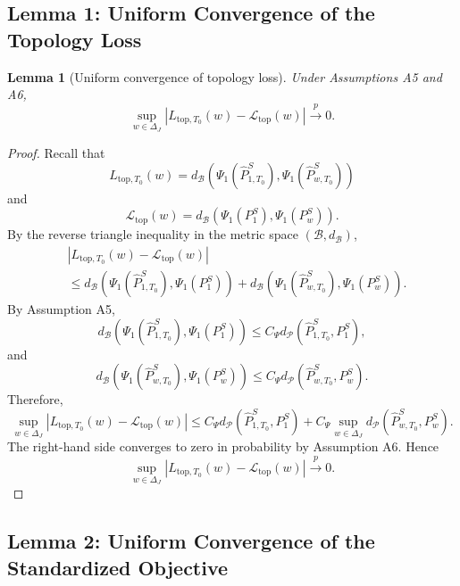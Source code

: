 \documentclass[11pt]{article}
\theoremstyle{plain}
\newtheorem{lemma}[lemma]{Lemma}
\theoremstyle{definition}
\theoremstyle{remark}
\newcommand{\1}{\mathbbm{1}}
\newcommand{\pto}{\xrightarrow{p}}
\begin{document}
\subsection{Lemma 1: Uniform Convergence of the Topology Loss}

\begin{lemma}[Uniform convergence of topology loss]
\label{lem:topology-uniform}
Under Assumptions A5 and A6,
\[
\sup_{w\in\Delta_J}
\left|
L_{\mathrm{top},T_0}(w)
-
\mathcal L_{\mathrm{top}}(w)
\right|
\pto 0.
\]
\end{lemma}

\begin{proof}
Recall that
\[
L_{\mathrm{top},T_0}(w)
=
d_{\mathcal B}
\left(
\Psi_1(\widehat P_{1,T_0}^{S}),
\Psi_1(\widehat P_{w,T_0}^{S})
\right)
\]
and
\[
\mathcal L_{\mathrm{top}}(w)
=
d_{\mathcal B}
\left(
\Psi_1(P_1^{S}),
\Psi_1(P_w^{S})
\right).
\]
By the reverse triangle inequality in the metric space
\((\mathcal B,d_{\mathcal B})\),
\[
\begin{aligned}
&
\left|
L_{\mathrm{top},T_0}(w)
-
\mathcal L_{\mathrm{top}}(w)
\right|
\\
&\le
d_{\mathcal B}
\left(
\Psi_1(\widehat P_{1,T_0}^{S}),
\Psi_1(P_1^{S})
\right)
+
d_{\mathcal B}
\left(
\Psi_1(\widehat P_{w,T_0}^{S}),
\Psi_1(P_w^{S})
\right).
\end{aligned}
\]
By Assumption A5,
\[
d_{\mathcal B}
\left(
\Psi_1(\widehat P_{1,T_0}^{S}),
\Psi_1(P_1^{S})
\right)
\le
C_\Psi d_{\mathcal P}(\widehat P_{1,T_0}^{S},P_1^{S}),
\]
and
\[
d_{\mathcal B}
\left(
\Psi_1(\widehat P_{w,T_0}^{S}),
\Psi_1(P_w^{S})
\right)
\le
C_\Psi d_{\mathcal P}(\widehat P_{w,T_0}^{S},P_w^{S}).
\]
Therefore,
\[
\sup_{w\in\Delta_J}
\left|
L_{\mathrm{top},T_0}(w)
-
\mathcal L_{\mathrm{top}}(w)
\right|
\le
C_\Psi d_{\mathcal P}(\widehat P_{1,T_0}^{S},P_1^{S})
+
C_\Psi
\sup_{w\in\Delta_J}
d_{\mathcal P}(\widehat P_{w,T_0}^{S},P_w^{S}).
\]
The right-hand side converges to zero in probability by Assumption A6. Hence
\[
\sup_{w\in\Delta_J}
\left|
L_{\mathrm{top},T_0}(w)
-
\mathcal L_{\mathrm{top}}(w)
\right|
\pto 0.
\]
\end{proof}

\subsection{Lemma 2: Uniform Convergence of the Standardized Objective}
\end{document}
